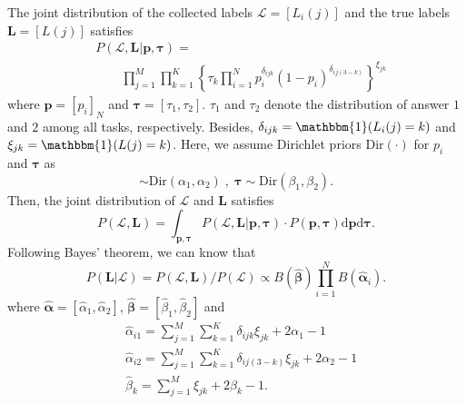  The joint distribution of the collected labels $\mathcal{L}=[L_i(j)]$ and the true labels $\bm{L}=[L(j)]$ satisfies
\begin{equation}
\label{JointDist}
\begin{split}
    &P(\mathcal{L},\bm{L}| \bm{p}, \bm{\tau})=\\ &\qquad {\prod}_{j=1}^{M}{\prod}_{k=1}^{K}\left\{\tau_{k}\prod_{i=1}^{N}p_i^{\delta_{ijk}}(1-p_i)^{\delta_{ij(3-k)}} \right\}^{\xi_{jk}}
\end{split}
\end{equation}
where $\bm{p}=[p_i]_N$ and $\bm{\tau}=[\tau_1,\tau_2]$. $\tau_1$ and $\tau_2$ denote the distribution of answer $1$ and $2$ among all tasks, respectively.
Besides,  $\delta_{ijk}=\mathbbm{1}(L_i(j)=k)$ and $\xi_{jk}= \mathbbm{1}(L(j)=k)$.
Here, we assume Dirichlet priors $\textrm{Dir}(\cdot)$ for $p_i$ and $\bm{\tau}$ as
\begin{equation}
[p_{i}, 1-p_i]\sim \textrm{Dir}(\alpha_{1},\alpha_{2})\;,\; \bm{\tau}\sim \textrm{Dir}(\beta_{1},\beta_{2}).
\end{equation}
Then, the joint distribution of $\mathcal{L}$ and $\bm{L}$ satisfies
\begin{equation}
\label{JointDist2}
P(\mathcal{L},\bm{L})={\int}_{\bm{p},\bm{\tau}}P(\mathcal{L},\bm{L}|\bm{p}, \bm{\tau})\cdot P(\bm{p}, \bm{\tau})\mathrm{d}\bm{p}\mathrm{d}\bm{\tau}.
\end{equation}
Following Bayes' theorem, we can know that
\begin{equation}
\label{PostDist}
P(\bm{L}|\mathcal{L})=P(\mathcal{L},\bm{L})/P(\mathcal{L})\propto B(\hat{\bm{\beta}}){\prod}_{i=1}^{N}B(\hat{\bm{\alpha}}_{i}). 
\end{equation}
%
where $\hat{\bm{\alpha}}=[\hat{\alpha}_1,\hat{\alpha}_2]$, $\hat{\bm{\beta}}=[\hat{\beta}_1,\hat{\beta}_2]$ and
\begin{equation}
\begin{split}
&\hat{\alpha}_{i1}={\sum}_{j=1}^{M}{\sum}_{k=1}^{K}\delta_{ijk}\xi_{jk}+2\alpha_{1}-1\\
&\hat{\alpha}_{i2}={\sum}_{j=1}^{M}{\sum}_{k=1}^{K}\delta_{ij(3-k)}\xi_{jk}+2\alpha_{2}-1\\
&\hat{\beta}_k={\sum}_{j=1}^{M}\xi_{jk}+2\beta_{k}-1.
\end{split}
\end{equation}
